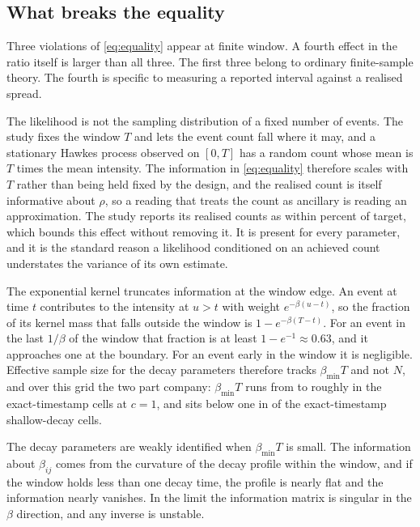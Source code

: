 \subsection{What breaks the equality}

Three violations of \eqref{eq:equality} appear at finite window. A fourth effect in
the ratio itself is larger than all three. The first three belong to ordinary
finite-sample theory. The fourth is specific to measuring a reported interval
against a realised spread.

The likelihood is not the sampling distribution of a fixed number of events. The
study fixes the window $T$ and lets the event count fall where it may, and a
stationary Hawkes process observed on $[0, T]$ has a random count whose mean is
$T$ times the mean intensity. The information in \eqref{eq:equality} therefore
scales with $T$ rather than being held fixed by the design, and the realised count
is itself informative about $\rho$, so a reading that treats the count as ancillary
is reading an approximation. The study reports its realised counts as within
\ThCountTolerance{} percent of target, which bounds this effect without removing
it. It is present for every parameter, and it is the standard reason a likelihood
conditioned on an achieved count understates the variance of its own estimate.

The exponential kernel truncates information at the window edge. An event at time
$t$ contributes to the intensity at $u > t$ with weight $e^{-\beta(u - t)}$, so the
fraction of its kernel mass that falls outside the window is $1 - e^{-\beta(T-t)}$.
For an event in the last $1/\beta$ of the window that fraction is at least
$1 - e^{-1} \approx 0.63$, and it approaches one at the boundary. For an event
early in the window it is negligible. Effective sample size for the decay
parameters therefore tracks $\beta_{\min} T$ and not $N$, and over this grid the
two part company: $\beta_{\min} T$ runs from \ThBetaMinTLow{} to roughly
\ThBetaMinTHigh{} in the exact-timestamp cells at $c = 1$, and sits below one in
\ThShallowBelowOne{} of the \ThShallowCells{} exact-timestamp shallow-decay cells.

The decay parameters are weakly identified when $\beta_{\min} T$ is small. The
information about $\beta_{ij}$ comes from the curvature of the decay profile
within the window, and if the window holds less than one decay time, the profile
is nearly flat and the information nearly vanishes. In the limit the information
matrix is singular in the $\beta$ direction, and any inverse is unstable.

